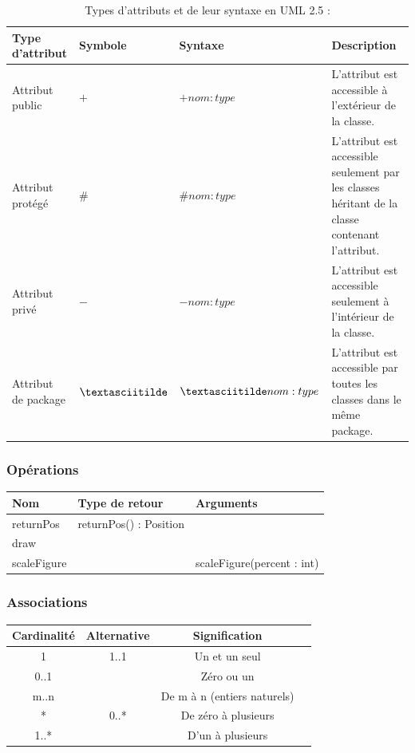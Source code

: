 \begin{table}[H]
\caption{Types d'attributs et de leur syntaxe en UML 2.5 :}
\label{tbl:class_attributs}
\begin{adjustbox}{max width=\textwidth}
\begin{tabular}{p{3cm}|p{2cm}|p{2cm}|l}
\toprule
\textbf{Type d'attribut} & \textbf{Symbole} & \textbf{Syntaxe} & \textbf{Description} \\
\midrule
Attribut public & $+$ & $+nom: type$ & L'attribut est accessible à l'extérieur de la classe. \\
Attribut protégé & $\#$ & $\#nom: type$ & L'attribut est accessible seulement par les classes héritant de la classe contenant l'attribut. \\
Attribut privé & $-$ & $-nom: type$ & L'attribut est accessible seulement à l'intérieur de la classe. \\
Attribut de package & $\textasciitilde$ & $\textasciitilde nom: type$ & L'attribut est accessible par toutes les classes dans le même package. \\
\bottomrule
\end{tabular}
\end{adjustbox}
\end{table}

\subsubsection{Opérations}

\begin{tabular}{p{3cm}p{5cm}p{3cm}}
\toprule
Nom & Type de retour & Arguments \\
\midrule
returnPos & returnPos() : Position & \\
draw & & \\
scaleFigure & & scaleFigure(percent : int) \\
\bottomrule
\end{tabular}


\subsubsection{Associations}
\begin{tabular}{cccc}
\toprule
Cardinalité & Alternative & Signification \\
\midrule
1 & 1..1 & Un et un seul \\
0..1 & & Zéro ou un \\
m..n& & De m à n (entiers naturels) \\
* & 0..* & De zéro à plusieurs \\

1..*&  & D'un à plusieurs \\
\bottomrule
\end{tabular}
